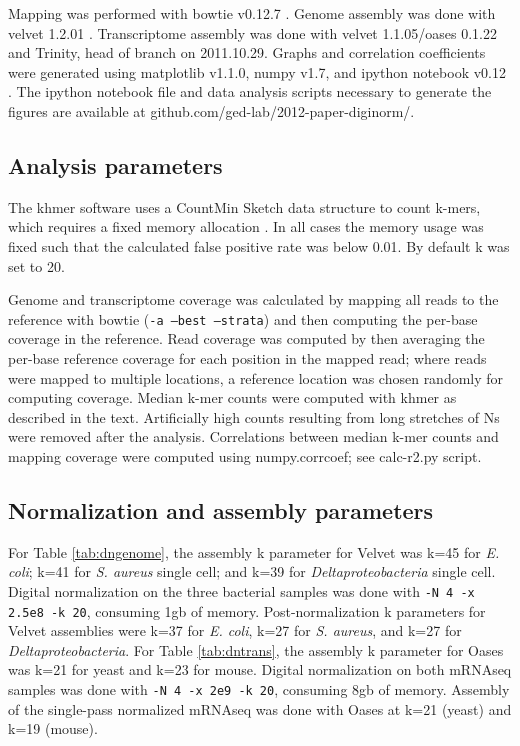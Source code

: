 Mapping was performed with bowtie v0.12.7 \cite{pubmed19261174}.
Genome assembly was done with velvet 1.2.01 \cite{pubmed18349386}.
Transcriptome assembly was done with velvet 1.1.05/oases 0.1.22 and
Trinity, head of branch on 2011.10.29.
Graphs and correlation coefficients were generated using matplotlib
v1.1.0, numpy v1.7, and ipython notebook v0.12 \cite{ipython}.  The
ipython notebook file and data analysis scripts necessary to generate
the figures are available at 
  github.com/ged-lab/2012-paper-diginorm/.


\subsection{Analysis parameters}

The khmer software uses a CountMin Sketch data structure to count
k-mers, which requires a fixed memory allocation
\cite{countminsketch}.  In all cases the memory usage was fixed such
that the calculated false positive rate was below 0.01.  By default k
was set to 20.

Genome and transcriptome coverage was calculated by mapping all reads
to the reference with bowtie ({\tt -a --best --strata}) and then
computing the per-base coverage in the reference.  Read coverage was
computed by then averaging the per-base reference coverage for each
position in the mapped read; where reads were mapped to multiple
locations, a reference location was chosen randomly for computing
coverage.  Median k-mer counts were computed with khmer as described
in the text.  Artificially high counts resulting from long stretches
of Ns were removed after the analysis.
Correlations between median k-mer counts and mapping coverage were
computed using numpy.corrcoef; see calc-r2.py script.

\subsection{Normalization and assembly parameters}

For Table \ref{tab:dngenome}, the assembly k parameter for Velvet was
k=45 for {\em E. coli}; k=41 for {\em S. aureus} single cell; and k=39
for {\em Deltaproteobacteria} single cell.  Digital normalization
on the three bacterial samples was done with {\tt -N 4 -x 2.5e8 -k 20},
consuming 1gb of memory.  Post-normalization k parameters for Velvet
assemblies were k=37 for {\em E. coli}, k=27 for {\em S. aureus}, and k=27 for {\em Deltaproteobacteria}.
For Table \ref{tab:dntrans}, the assembly k parameter for Oases was k=21 for yeast
and k=23 for mouse.  Digital normalization on both mRNAseq samples was done
with {\tt -N 4 -x 2e9 -k 20}, consuming 8gb of memory.  Assembly of the
single-pass normalized mRNAseq was done with Oases at k=21 (yeast) and k=19
(mouse).

